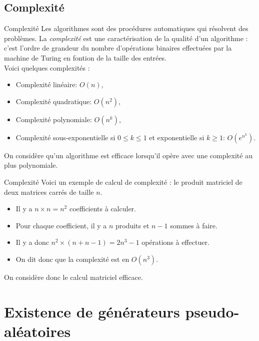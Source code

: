 \documentclass[utf8,10pt,french]{beamer}
\newcommand{\com}[1]{\texttt{\color{red}#1}}
\newcommand{\var}[1]{\textit{\color{green!50!black}#1}}
\begin{document}
\subsection{Complexité}
\begin{frame}{Complexité}
Les algorithmes sont des procédures automatiques qui résolvent des problèmes. La \var{complexité} est une caractérisation de la qualité d'un algorithme : c'est l'ordre de grandeur du nombre d'opérations binaires effectuées par la machine de Turing en fontion de la taille des entrées.\\
Voici quelques complexités : 
\begin{itemize}
\item Complexité linéaire: \com{$O(n)$},
\item Complexité quadratique: \com{$O(n^2)$},
\item Complexité polynomiale: \com{$O(n^k)$},
\item Complexité sous-exponentielle si $0 \leq k \leq 1$ et exponentielle si $k \ge 1$: \com{$O(e^{n^k})$}. 
\end{itemize}
On considère qu'un algorithme est efficace lorsqu'il opère avec une complexité au plus polynomiale.
\end{frame}

\begin{frame}{Complexité}
Voici un exemple de calcul de complexité : le produit matriciel de deux matrices carrés de taille $n$.
\begin{itemize}
\item Il y a $n \times n = n^2$ coefficients à calculer.\pause
\item Pour chaque coefficient, il y a $n$ produits et $n-1$ sommes à faire.\pause
\item Il y a donc $n^2 \times (n + n - 1) = 2n^3 - 1$ opérations à effectuer.\pause
\item On dit donc que la complexité est en $O(n^3)$.
\end{itemize}
On considère donc le calcul matriciel efficace.
\end{frame}

\section{Existence de générateurs pseudo-aléatoires}
\end{document}
